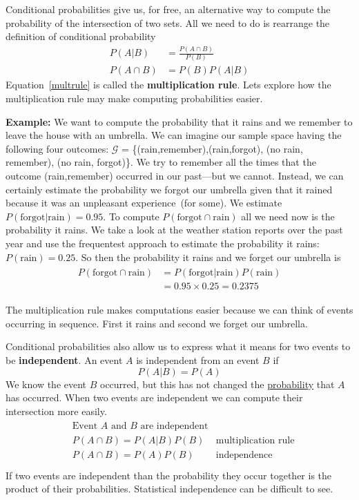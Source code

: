 Conditional probabilities give us, for free, an alternative way to compute the probability of the intersection of two sets.
All we need to do is rearrange the definition of conditional probability
\begin{align}
       P(A|B) &= \frac{P(A \cap B)}{P(B)} \\ 
       P(A \cap B) &= P(B)P(A|B) \label{multrule}
\end{align}
Equation~\eqref{multrule} is called the \textbf{multiplication rule}.
Lets explore how the multiplication rule may make computing probabilities easier.

\textbf{Example:} We want to compute the probability that it rains and we remember to leave the house with an umbrella. We can imagine our sample space having the following four outcomes: $\mathcal{G}$ = \{(rain,remember),(rain,forgot), (no rain, remember), (no rain, forgot)\}. We try to remember all the times that the outcome (rain,remember) occurred in our past---but we cannot. Instead, we can certainly estimate the probability we forgot our umbrella given that it rained because it was an unpleasant experience~(for some). We estimate $P(\text{forgot}|\text{rain}) = 0.95$.
To compute $P(\text{forgot} \cap \text{rain})$ all we need now is the probability it rains. We take a look at the weather station reports over the  past year and use the frequentest approach to estimate the probability it rains:$P(\text{rain}) = 0.25$. So then the probability it rains and we forget our umbrella is 
\begin{align}
    \begin{aligned}
        P(\text{forgot} \cap \text{rain}) &= P(\text{forgot}|\text{rain})P(\text{rain})\\
        &=0.95 \times 0.25 = 0.2375
    \end{aligned}
\end{align}

The multiplication rule makes computations easier because we can think of events occurring in sequence. First it rains and second we forget our umbrella.

Conditional probabilities also allow us to express what it means for two events to be \textbf{independent}.
An event $A$ is independent from an event $B$ if
\begin{equation}
    P(A|B) = P(A)
\end{equation}
We know the event $B$ occurred, but this has not changed the \underline{probability} that $A$ has occurred.
When two events are independent we can compute their intersection more easily.
\begin{align}
    \begin{aligned}
        &\text{Event } A \text{ and } B  \text{ are independent}\\
        &P(A \cap B) = P(A|B)P(B)  &\text{multiplication rule}\\
        &P(A \cap B) = P(A)P(B)    &\text{independence}\\
    \end{aligned}
\end{align}
If two events are independent than the probability they occur together is the product of their probabilities.
Statistical independence can be difficult to see.

